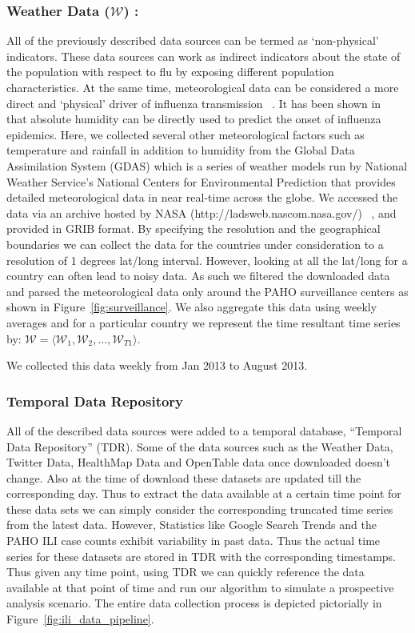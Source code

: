 \subsubsection{Weather Data ($\mathcal{W}$) :}
All of the previously described data sources can
be termed as `non-physical' indicators. These data sources can work as indirect
indicators about the state of the population with respect to flu by exposing
different population characteristics. At the same time, meteorological data can
be considered a more direct and `physical' driver of influenza transmission
~\cite{flu_humidity_physical}. It has been shown
in~\cite{Shaman_orig_humidity_link, Shaman_humidity_USA, ref9}
that absolute humidity can be directly used to predict the onset of influenza
epidemics. Here, we collected several other meteorological factors such as
temperature and rainfall in addition to humidity from the Global Data
Assimilation System (GDAS) which is a series of weather models run by National
Weather Service's National Centers for Environmental Prediction that provides
detailed meteorological data in near real-time across the globe.  We accessed
the data via an archive hosted by NASA (http://ladsweb.nascom.nasa.gov/)
~\cite{HD:2013}, and provided in GRIB format. By specifying the resolution and
the geographical boundaries we can collect the data for the countries under
consideration to a resolution of 1 degrees lat/long interval. However, looking
at all the lat/long for a country can often lead to noisy data. As such we
filtered the downloaded data and parsed the meteorological data only around the
PAHO surveillance centers as shown in Figure~\ref{fig:surveillance}. We also
aggregate this data using weekly averages and for a particular country we
represent the time resultant time series by: 
$\mathcal{W} = \langle \mathcal{W}_1, \mathcal{W}_2, \dots, \mathcal{W}_{T1} \rangle$.

We collected this data weekly from Jan 2013 to August 2013. 


\subsubsection{Temporal Data Repository}
All of the described data sources were
added to a temporal database, ``Temporal Data Repository'' (TDR). Some of the
data sources such as the Weather Data, Twitter Data, HealthMap Data and
OpenTable data once downloaded doesn't change. Also at the time of download
these datasets are updated till the corresponding day.  Thus to extract the
data available at a certain time point for these data sets we can simply
consider the corresponding truncated time series from the latest data. However,
Statistics like Google Search Trends and the PAHO ILI case counts exhibit
variability in past data. Thus the actual time series for these datasets are
stored in TDR with the corresponding timestamps. Thus given any time point,
using TDR we can quickly reference the data available at that point of time and
run our algorithm to simulate a prospective analysis scenario.  The entire data
collection process is depicted pictorially in
Figure~\ref{fig:ili_data_pipeline}.



